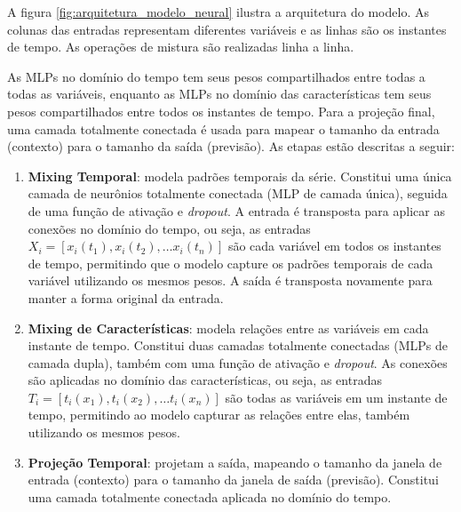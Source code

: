 \begin{figure}[!ht]
	{}
	{}
\end{figure}

A figura \ref{fig:arquitetura_modelo_neural} ilustra a arquitetura do modelo. As colunas das entradas representam diferentes
variáveis e as linhas são os instantes de tempo. As operações de mistura são realizadas linha a linha. 

As MLPs no domínio do tempo tem seus pesos compartilhados entre todas a todas as variáveis, enquanto as MLPs no domínio das 
características tem seus pesos compartilhados entre todos os instantes de tempo. Para a projeção final, uma camada totalmente 
conectada é usada para mapear o tamanho da entrada (contexto) para o tamanho da saída (previsão). As etapas estão descritas a seguir:

\begin{enumerate}
	\item \textbf{Mixing Temporal}: modela padrões temporais da série. Constitui uma única camada de neurônios totalmente
conectada (MLP de camada única), seguida de uma função de ativação e \textit{dropout}. A entrada é transposta para aplicar 
as conexões no domínio do tempo, ou seja, as entradas $ X_i = [x_i(t_1), x_i(t_2), \dots x_i(t_n)] $ são cada variável em todos 
os instantes de tempo, permitindo que o modelo capture os padrões temporais de cada variável utilizando os mesmos pesos.
A saída é transposta novamente para manter a forma original da entrada.

	\item \textbf{Mixing de Características}: modela relações entre as variáveis em cada instante de tempo. Constitui
duas camadas totalmente conectadas (MLPs de camada dupla), também com uma função de ativação e \textit{dropout}. As conexões
são aplicadas no domínio das características, ou seja, as entradas $ T_i = [t_i(x_1), t_i(x_2), \dots t_i(x_n)] $ são
todas as variáveis em um instante de tempo, permitindo ao modelo capturar as relações entre elas, também utilizando os
mesmos pesos.

	\item \textbf{Projeção Temporal}: projetam a saída, mapeando o tamanho da janela de entrada (contexto) para o tamanho 
da janela de saída (previsão). Constitui uma camada totalmente conectada aplicada no domínio do tempo.
\end{enumerate}

